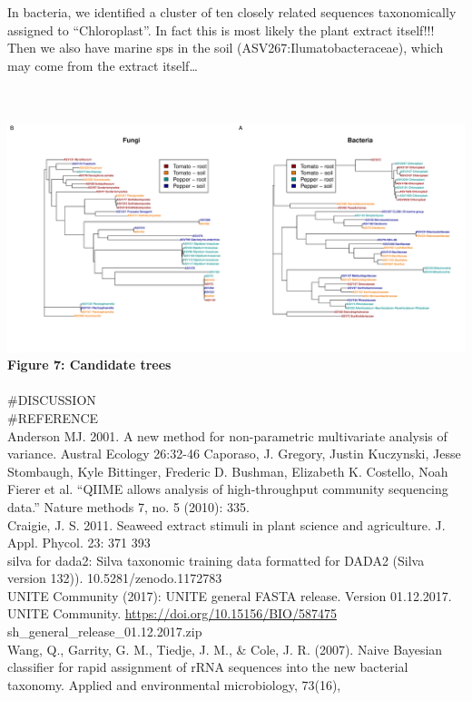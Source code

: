 \documentclass[11pt,]{article}
\begin{document}
In bacteria, we identified a cluster of ten closely related sequences
taxonomically assigned to ``Chloroplast''. In fact this is most likely
the plant extract itself!!! Then we also have marine sps in the soil
(ASV267:Ilumatobacteraceae), which may come from the extract
itself\ldots{}

~\\
\hspace*{0.333em}\\
\includegraphics{../figures/Figure7_candidateASVs.pdf}\\
\textbf{Figure 7: Candidate trees} ~\\
\hspace*{0.333em}\\
\newpage   \#DISCUSSION\\
\newpage   \#REFERENCE\\
Anderson MJ. 2001. A new method for non-parametric multivariate analysis
of variance. Austral Ecology 26:32-46 Caporaso, J. Gregory, Justin
Kuczynski, Jesse Stombaugh, Kyle Bittinger, Frederic D. Bushman,
Elizabeth K. Costello, Noah Fierer et al. ``QIIME allows analysis of
high-throughput community sequencing data.'' Nature methods 7, no. 5
(2010): 335. ~\\
Craigie, J. S. 2011. Seaweed extract stimuli in plant science and
agriculture. J. Appl. Phycol. 23: 371 393 ~\\
silva for dada2: Silva taxonomic training data formatted for DADA2
(Silva version 132)). 10.5281/zenodo.1172783 ~\\
UNITE Community (2017): UNITE general FASTA release. Version 01.12.2017.
UNITE Community. \url{https://doi.org/10.15156/BIO/587475}
sh\_general\_release\_01.12.2017.zip ~\\
Wang, Q., Garrity, G. M., Tiedje, J. M., \& Cole, J. R. (2007). Naive
Bayesian classifier for rapid assignment of rRNA sequences into the new
bacterial taxonomy. Applied and environmental microbiology, 73(16),
\end{document}
